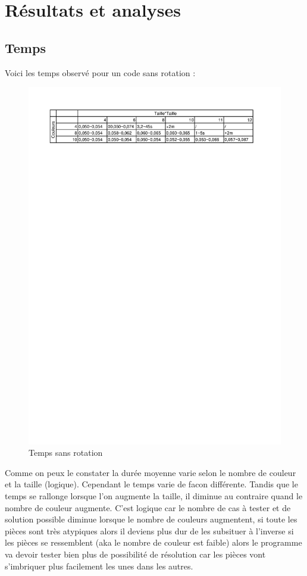\documentclass[french]{rapportAlgoM1}
\begin{document}
\section*{Résultats et analyses}

\subsection*{Temps}

Voici les temps observé pour un code sans rotation :
\begin{figure}
  \includegraphics[width=\linewidth]{img/TimeNR.png}
  \caption{Temps sans rotation}
  \label{img:timeNR}
\end{figure}
Comme on peux le constater la durée moyenne varie selon le nombre de couleur et la taille (logique). Cependant le temps varie de facon différente. Tandis que le temps se rallonge lorsque l'on augmente la taille, il diminue au contraire quand le nombre de couleur augmente. C'est logique car le nombre de cas à tester et de solution possible diminue lorsque le nombre de couleurs augmentent, si toute les pièces sont très atypiques alors il deviens plus dur de les subsituer à l'inverse si les pièces se ressemblent (aka le nombre de couleur est faible) alors le programme va devoir tester bien plus de possibilité de résolution car les pièces vont s'imbriquer plus facilement les unes dans les autres.
\end{document}
